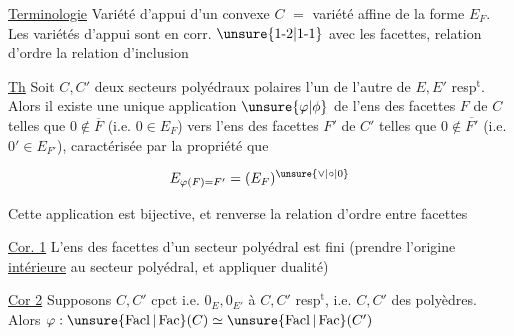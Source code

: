 
\uline{Terminologie} Variété d'appui d'un convexe $C$ $=$ variété affine de la forme $E_F$. Les variétés d'appui sont en corr. $\unsure{1\text{-}2|1\text{-}1}$ avec les facettes, relation d'ordre la relation d'inclusion

 \uline{Th} Soit $C,C'$ deux secteurs polyédraux polaires l'un de l'autre de $E,E'$ resp$^{\mathrm t}$. Alors il existe une unique  application $\unsure{\varphi|\phi}$ de l'ens des facettes $F$ de $C$ telles que $0\notin\overline F$ (i.e. $0\in E_F$) vers l'ens des facettes $F'$ de $C'$ telles que $0\notin\overline{F'}$ (i.e. $0'\in E_{F'}$), caractérisée par la propriété que  

\[
 E_{\varphi(F)=F'}=(E_F)^{\unsure{\vee|\circ|0}}
\]

Cette application est bijective, et renverse la relation d'ordre entre facettes

\uline{Cor. 1} L'ens des facettes d'un secteur polyédral est fini (prendre l'origine \uline{intérieure} au secteur polyédral, et appliquer dualité)

\uline{Cor 2} Supposons $C,C'$ cpct  i.e.  $0_E,0_{E'}$  à $C,C'$ resp$^{\mathrm t}$, i.e. $C,C'$ des polyèdres. Alors $\varphi:\unsure{\operatorname{Facl}|\operatorname{Fac}}(C)\simeq\unsure{\operatorname{Facl}|\operatorname{Fac}}(C')$
